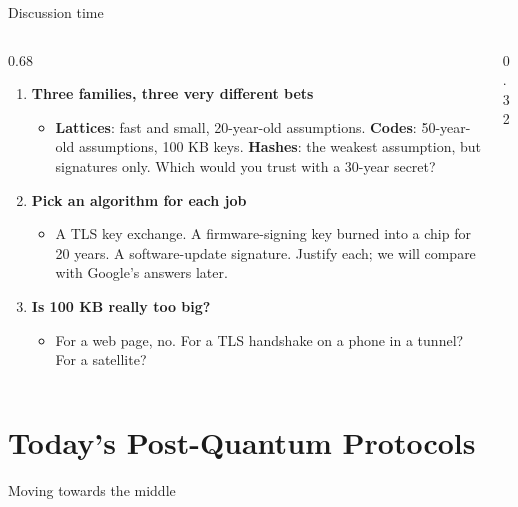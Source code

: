 \ifdefined\PRESENTATION\else\PassOptionsToClass{handout}{beamer}\fi\documentclass[aspectratio=169, lualatex]{beamer}
\begin{document}
\begin{frame}{Discussion time}
	\begin{columns}[c]
		\begin{column}{0.68\textwidth}
			\begin{enumerate}
				\item \textbf{Three families, three very different bets}
				      \begin{itemize}
					      \item \textbf{Lattices}: fast and small, 20-year-old assumptions. \textbf{Codes}: 50-year-old assumptions, 100 KB keys. \textbf{Hashes}: the weakest assumption, but signatures only. Which would you trust with a 30-year secret?
				      \end{itemize}
				\item \textbf{Pick an algorithm for each job}
				      \begin{itemize}
					      \item A TLS key exchange. A firmware-signing key burned into a chip for 20 years. A software-update signature. Justify each; we will compare with Google's answers later.
				      \end{itemize}
				\item \textbf{Is 100 KB really too big?}
				      \begin{itemize}
					      \item For a web page, no. For a TLS handshake on a phone in a tunnel? For a satellite?
				      \end{itemize}
			\end{enumerate}
		\end{column}
		\begin{column}{0.32\textwidth}
		\end{column}
	\end{columns}
\end{frame}

\section{Today's Post-Quantum Protocols}

\begin{frame}{Moving towards the middle}
\end{frame}
\end{document}
